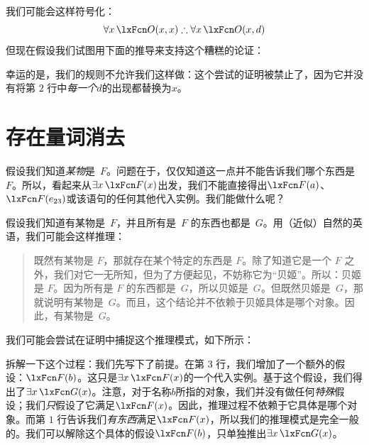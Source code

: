 我们可能会这样符号化：
$$\forall x\,\atom{O}{x,x} \therefore \forall x\,\atom{O}{x,d}$$
但现在假设我们试图用下面的推导来支持这个糟糕的论证：

\begin{fitchproof}
	\PR
\end{fitchproof}

幸运的是，我们的规则不允许我们这样做：这个尝试的证明被禁止了，因为它并没有将第 $2$ 行中\emph{每一个}$d$的出现都替换为$x$。

\section{存在量词消去}\label{s:existsElim}

假设我们知道\emph{某物}是~$F$。问题在于，仅仅知道这一点并不能告诉我们哪个东西是~$F$。所以，看起来从$\exists x\,\atom{F}{x}$出发，我们不能直接得出$\atom{F}{a}$、$\atom{F}{e_{23}}$或该语句的任何其他代入实例。我们能做什么呢？

假设我们知道有某物是~$F$，并且所有是~$F$ 的东西也都是~$G$。用（近似）自然的英语，我们可能会这样推理：

\begin{quote}
		既然有某物是 $F$，那就存在某个特定的东西是 $F$。除了知道它是一个 $F$ 之外，我们对它一无所知，但为了方便起见，不妨称它为“贝姬”。所以：贝姬是 $F$。因为所有是 $F$ 的东西都是~$G$，所以贝姬是~$G$。但既然贝姬是~$G$，那就说明有某物是~$G$。而且，这个结论并不依赖于贝姬具体是哪个对象。因此，有某物是~$G$。
	\end{quote}

我们可能会尝试在证明中捕捉这个推理模式，如下所示：

\begin{fitchproof}
	\PR
	\PR
	\open
		\AS
		 
	\close
\end{fitchproof}

\noindent
拆解一下这个过程：我们先写下了前提。在第 $3$ 行，我们增加了一个额外的假设：$\atom{F}{b}$。这只是$\exists x\,\atom{F}{x}$的一个代入实例。基于这个假设，我们得出了$\exists x\,\atom{G}{x}$。注意，对于名称$b$所指的对象，我们并没有做任何\emph{特殊}假设；我们\emph{只}假设了它满足$\atom{F}{x}$。因此，推理过程不依赖于它具体是哪个对象。而第 $1$ 行告诉我们\emph{有东西}满足$\atom{F}{x}$，所以我们的推理模式是完全一般的。我们可以解除这个具体的假设$\atom{F}{b}$，只单独推出$\exists x\,\atom{G}{x}$。

